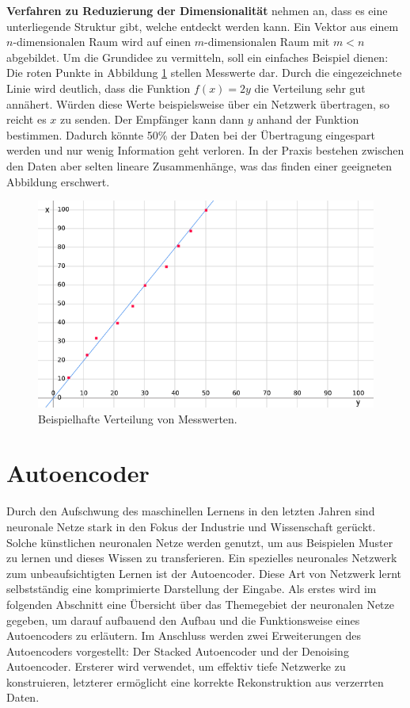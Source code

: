 \textbf{Verfahren zu Reduzierung der Dimensionalität} nehmen an, dass es eine unterliegende Struktur gibt, welche entdeckt werden kann. Ein Vektor aus einem $n$-dimensionalen Raum wird auf einen $m$-dimensionalen Raum mit $m < n$ abgebildet. Um die Grundidee zu vermitteln, soll ein einfaches Beispiel dienen: Die roten Punkte in Abbildung \ref{img:compress2} stellen Messwerte dar. Durch die eingezeichnete Linie wird deutlich, dass die Funktion $f(x)=2y$ die Verteilung sehr gut annähert. Würden diese Werte beispielsweise über ein Netzwerk übertragen, so reicht es $x$ zu senden. Der Empfänger kann dann $y$ anhand der Funktion bestimmen. Dadurch könnte 50\% der Daten bei der Übertragung eingespart werden und nur wenig Information geht verloren. In der Praxis bestehen zwischen den Daten aber selten lineare Zusammenhänge, was das finden einer geeigneten Abbildung erschwert. \newline 
\begin{figure}
	\centering
	\includegraphics[scale=0.65]{images/compress2d.png}
	\caption{Beispielhafte Verteilung von Messwerten.}
	\label{img:compress2}
\end{figure}

\section{Autoencoder}

Durch den Aufschwung des maschinellen Lernens in den letzten Jahren sind neuronale Netze stark in den Fokus der Industrie und Wissenschaft gerückt. Solche künstlichen neuronalen Netze werden genutzt, um aus Beispielen Muster zu lernen und dieses Wissen zu transferieren.\newline
Ein spezielles neuronales Netzwerk zum unbeaufsichtigten Lernen ist der Autoencoder. Diese Art von Netzwerk lernt selbstständig eine komprimierte Darstellung der Eingabe.  
Als erstes wird im folgenden Abschnitt eine Übersicht über das Themegebiet der neuronalen Netze gegeben, um darauf aufbauend den Aufbau und die Funktionsweise eines Autoencoders zu erläutern. Im Anschluss werden zwei Erweiterungen des Autoencoders vorgestellt: Der Stacked Autoencoder und der Denoising Autoencoder. Ersterer wird verwendet, um effektiv tiefe Netzwerke zu konstruieren, letzterer ermöglicht eine korrekte Rekonstruktion aus verzerrten Daten.

